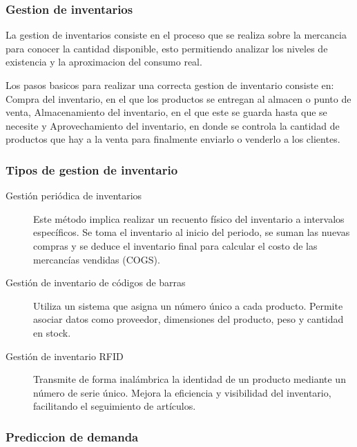 \subsubsection{Gestion de inventarios}

La gestion de inventarios consiste en el proceso que se realiza sobre la mercancia para conocer la cantidad disponible, esto permitiendo analizar los niveles de existencia y la aproximacion del consumo real.\cite{meana2024gestión}

Los pasos basicos para realizar una correcta gestion de inventario consiste en: Compra del inventario, en el que los productos se entregan al almacen o punto de venta, Almacenamiento del inventario, en el que este se guarda hasta que se necesite y Aprovechamiento del inventario, en donde se controla la cantidad de productos que hay a la venta para finalmente enviarlo o venderlo a los clientes.\cite{ibm_inventario}

\subsubsection{Tipos de gestion de inventario}

\begin{description}
    \item[Gestión periódica de inventarios] Este método implica realizar un recuento físico del inventario a intervalos específicos. Se toma el inventario al inicio del periodo, se suman las nuevas compras y se deduce el inventario final para calcular el costo de las mercancías vendidas (COGS).\cite{ibm_inventario}

    \item[Gestión de inventario de códigos de barras] Utiliza un sistema que asigna un número único a cada producto. Permite asociar datos como proveedor, dimensiones del producto, peso y cantidad en stock.\cite{ibm_inventario}

    \item[Gestión de inventario RFID] Transmite de forma inalámbrica la identidad de un producto mediante un número de serie único. Mejora la eficiencia y visibilidad del inventario, facilitando el seguimiento de artículos.\cite{ibm_inventario}
    
\end{description}

\subsubsection{Prediccion de demanda}

